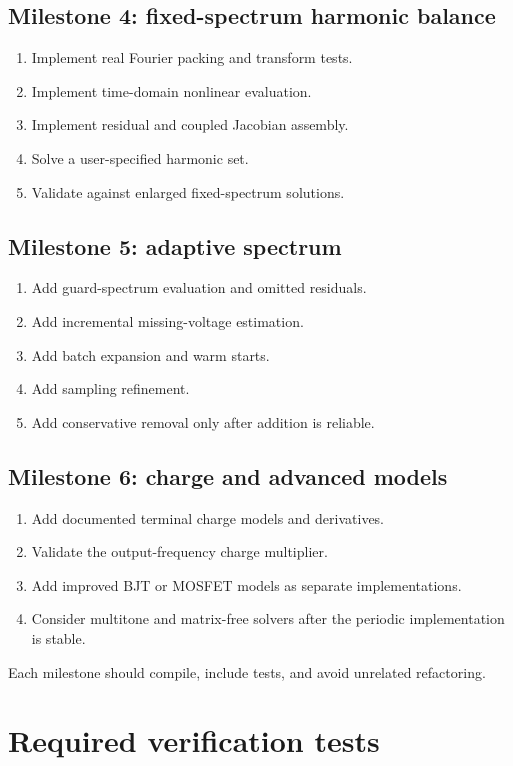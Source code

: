 \documentclass[11pt,a4paper]{article}
\begin{document}
\subsection*{Milestone 4: fixed-spectrum harmonic balance}
\begin{enumerate}
 \item Implement real Fourier packing and transform tests.
 \item Implement time-domain nonlinear evaluation.
 \item Implement residual and coupled Jacobian assembly.
 \item Solve a user-specified harmonic set.
 \item Validate against enlarged fixed-spectrum solutions.
\end{enumerate}

\subsection*{Milestone 5: adaptive spectrum}
\begin{enumerate}
 \item Add guard-spectrum evaluation and omitted residuals.
 \item Add incremental missing-voltage estimation.
 \item Add batch expansion and warm starts.
 \item Add sampling refinement.
 \item Add conservative removal only after addition is reliable.
\end{enumerate}

\subsection*{Milestone 6: charge and advanced models}
\begin{enumerate}
 \item Add documented terminal charge models and derivatives.
 \item Validate the output-frequency charge multiplier.
 \item Add improved BJT or MOSFET models as separate implementations.
 \item Consider multitone and matrix-free solvers after the periodic
       implementation is stable.
\end{enumerate}

Each milestone should compile, include tests, and avoid unrelated
refactoring.

\section{Required verification tests}
\end{document}
